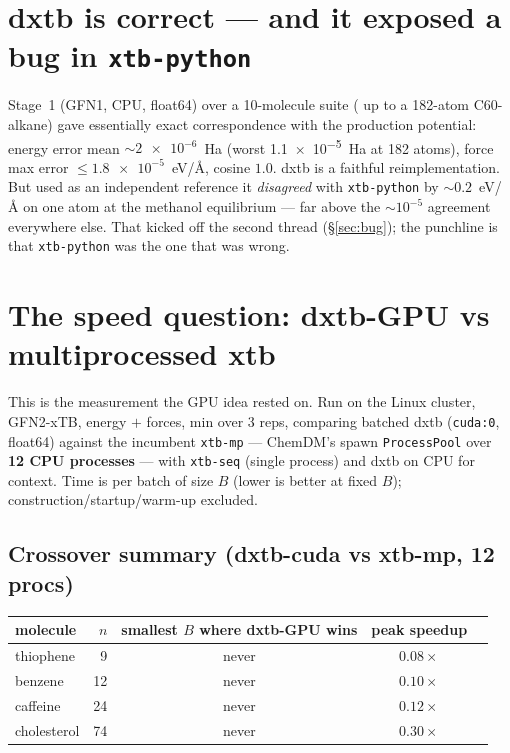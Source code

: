\documentclass[11pt]{article}
\newcommand{\code}[1]{\texttt{#1}}
\newcommand{\xtbpy}{\code{xtb-python}}
\begin{document}
\section{dxtb is correct --- and it exposed a bug in \xtbpy{}}

Stage~1 (GFN1, CPU, float64) over a 10-molecule suite ( up to a 182-atom
C60-alkane) gave essentially exact correspondence with the production potential:
energy error mean $\sim\!\num{2e-6}$~Ha (worst \num{1.1e-5}~Ha at 182 atoms),
force max error $\le \num{1.8e-5}$~eV/\AA, cosine $1.0$. dxtb is a faithful
reimplementation. But used as an independent reference it \emph{disagreed} with
\xtbpy{} by $\sim\!0.2$~eV/\AA{} on one atom at the methanol equilibrium --- far
above the $\sim\!10^{-5}$ agreement everywhere else. That kicked off the second
thread (\S\ref{sec:bug}); the punchline is that \xtbpy{} was the one that was
wrong.

\section{The speed question: dxtb-GPU vs multiprocessed xtb}
\label{sec:speed}

This is the measurement the GPU idea rested on. Run on the Linux cluster,
GFN2-xTB, energy $+$ forces, min over 3 reps, comparing batched dxtb (\code{cuda:0},
float64) against the incumbent \code{xtb-mp} --- ChemDM's spawn \code{ProcessPool}
over \textbf{12 CPU processes} --- with \code{xtb-seq} (single process) and dxtb on
CPU for context. Time is per batch of size $B$ (lower is better at fixed $B$);
construction/startup/warm-up excluded.

\subsection{Crossover summary (dxtb-cuda vs xtb-mp, 12 procs)}

\begin{center}
\begin{tabular}{lrccr}
\toprule
molecule & $n$ & smallest $B$ where dxtb-GPU wins & peak speedup \\
\midrule
thiophene   &  9 & never & $0.08\times$ \\
benzene     & 12 & never & $0.10\times$ \\
caffeine    & 24 & never & $0.12\times$ \\
cholesterol & 74 & never & $0.30\times$ \\
\bottomrule
\end{tabular}
\end{center}
\end{document}
